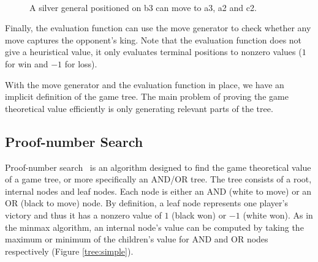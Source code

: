 \documentclass{article}
\begin{document}
\begin{figure}[h]
\center
    \mbox{
       \quad
      }
\caption{A silver general positioned on b3 can move to a3, a2 and c2.}
\label{moveboard}
\end{figure}

Finally, the evaluation function can use the move generator to check whether any move captures the opponent's king. Note that the evaluation function
does not give a heuristical value, it only evaluates terminal positions to nonzero values ($1$ for win and $-1$ for loss).

With the move generator and the evaluation function in place, we have an implicit definition of the game tree. The main problem of proving the game
theoretical value efficiently is only generating relevant parts of the tree.

\subsection{Proof-number Search}
\label{pnsearch}
Proof-number search~\cite{allis1994proof} is an algorithm designed to find the game theoretical value of a game tree, or more specifically an AND/OR tree.
The tree consists of a root, internal nodes and leaf nodes. Each node is either an AND (white to move) or an OR (black to move) node. By definition, a leaf
node represents one player's victory and thus it has a nonzero value of $1$ (black won) or $-1$ (white won). As in the minmax algorithm, an internal
node's value can be computed by taking the maximum or minimum of the children's value for AND and OR nodes respectively (Figure \ref{tree:simple}).
\end{document}
